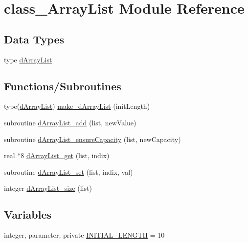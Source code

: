 \hypertarget{namespaceclass__ArrayList}{
\section{class\_\-ArrayList Module Reference}
\label{namespaceclass__ArrayList}
}
\subsection*{Data Types}
\begin{DoxyCompactItemize}
\item 
type \hyperlink{typeclass__ArrayList_1_1dArrayList}{dArrayList}
\end{DoxyCompactItemize}
\subsection*{Functions/Subroutines}
\begin{DoxyCompactItemize}
\item 
type(\hyperlink{typeclass__ArrayList_1_1dArrayList}{dArrayList}) \hyperlink{namespaceclass__ArrayList_a5363f41df7698922433c25c73d02173d}{make\_\-dArrayList} (initLength)
\item 
subroutine \hyperlink{namespaceclass__ArrayList_a87eba505c7caff1cf303b9f92182aab2}{dArrayList\_\-add} (list, newValue)
\item 
subroutine \hyperlink{namespaceclass__ArrayList_a772b1369610a1b6481ef81093a7ecadf}{dArrayList\_\-ensureCapacity} (list, newCapacity)
\item 
real $\ast$8 \hyperlink{namespaceclass__ArrayList_a956a11e0e4778170667c2e90c9097766}{dArrayList\_\-get} (list, indix)
\item 
subroutine \hyperlink{namespaceclass__ArrayList_ad92f2ac90292027093572f20b4be9dc6}{dArrayList\_\-set} (list, indix, val)
\item 
integer \hyperlink{namespaceclass__ArrayList_a723eb1c041604ffeb1a0434c521de640}{dArrayList\_\-size} (list)
\end{DoxyCompactItemize}
\subsection*{Variables}
\begin{DoxyCompactItemize}
\item 
integer, parameter, private \hyperlink{namespaceclass__ArrayList_a710a353a125e9fcbc6bbb0fc3a468afb}{INITIAL\_\-LENGTH} = 10
\end{DoxyCompactItemize}


